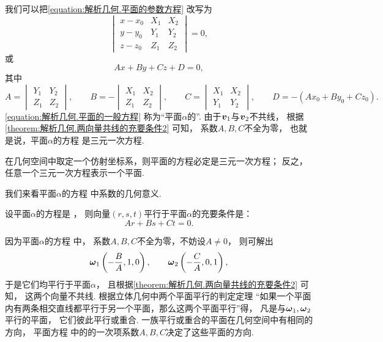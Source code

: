 我们可以把\cref{equation:解析几何.平面的参数方程} 改写为
\begin{equation}
	\begin{vmatrix}
		x - x_0 & X_1 & X_2 \\
		y - y_0 & Y_1 & Y_2 \\
		z - z_0 & Z_1 & Z_2
	\end{vmatrix} = 0,
\end{equation}
或\begin{equation}\label{equation:解析几何.平面的一般方程}
	A x + B y + C z + D = 0,
\end{equation}
其中\[
	A = \begin{vmatrix}
		Y_1 & Y_2 \\
		Z_1 & Z_2
	\end{vmatrix},
	\qquad
	B = -\begin{vmatrix}
		X_1 & X_2 \\
		Z_1 & Z_2
	\end{vmatrix},
	\qquad
	C = \begin{vmatrix}
		X_1 & X_2 \\
		Y_1 & Y_2
	\end{vmatrix},
	\qquad
	D = - (A x_0 + B y_0 + C z_0).
\]
\cref{equation:解析几何.平面的一般方程}
称为“平面\(\alpha\)的”.
由于\(\boldsymbol{v}_1\)与\(\boldsymbol{v}_2\)不共线，
根据\cref{theorem:解析几何.两向量共线的充要条件2} 可知，
系数\(A,B,C\)不全为零，
也就是说，平面\(\alpha\)的方程  是三元一次方程.

\begin{theorem}
在几何空间中取定一个仿射坐标系，则平面的方程必定是三元一次方程；
反之，任意一个三元一次方程表示一个平面.
\end{theorem}

我们来看平面\(\alpha\)的方程  中系数的几何意义.

\begin{theorem}
设平面\(\alpha\)的方程是 ，
则向量\((r,s,t)\)平行于平面\(\alpha\)的充要条件是：\[
	Ar+Bs+Ct = 0.
\]
\end{theorem}

因为平面\(\alpha\)的方程  中，
系数\(A,B,C\)不全为零，不妨设\(A\neq0\)，
则可解出\[
	\boldsymbol{\omega}_1 \left( -\frac{B}{A},1,0 \right), \qquad
	\boldsymbol{\omega}_2 \left( -\frac{C}{A},0,1 \right),
\]
于是它们均平行于平面\(\alpha\)，
且根据\cref{theorem:解析几何.两向量共线的充要条件2} 可知，
这两个向量不共线.
根据立体几何中两个平面平行的判定定理
“如果一个平面内有两条相交直线都平行于另一个平面，那么这两个平面平行”得，
凡是与\(\boldsymbol{\omega}_1,\boldsymbol{\omega}_2\)平行的平面，
它们彼此平行或重合.
一族平行或重合的平面在几何空间中有相同的方向，
平面方程  中的的一次项系数\(A,B,C\)决定了这些平面的方向.

